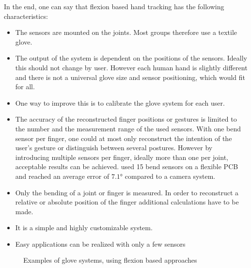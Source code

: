 In the end, one can say that flexion based hand tracking has the following characteristics:\\
\begin{itemize}
\item The sensors are mounted on the joints. Most groups therefore use a textile glove. 
\item The output of the system is dependent on the positions of the sensors. Ideally this should not change by user. However each human hand is slightly different and there is not a universal glove size and sensor positioning, which would fit for all.
\item One way to improve this is to calibrate the glove system for each user.
\item The accuracy of the reconstructed finger positions or gestures is limited to the number and the measurement range of the used sensors. With one bend sensor per finger, one could at most only reconstruct the intention of the user's gesture or distinguish between several postures. However by introducing multiple sensors per finger, ideally more than one per joint, acceptable results can be achieved. \cite{zecca2007development} used 15 bend sensors on a flexible PCB and reached an average error of $ \ang{7.1} $  compared to a camera system.
\item Only the bending of a joint or finger is measured. In order to reconstruct a relative or absolute position of the finger additional calculations have to be made.
\item It is a simple and highly customizable system.
\item Easy applications can be realized with only a few sensors
\end{itemize}

\begin{figure}[h]
	\hfill
	\hfill
	
	\caption[Flexion based glove systems]{Examples of glove systems, using flexion based approaches}
	\label{fig:examplesFlexion}
\end{figure}



